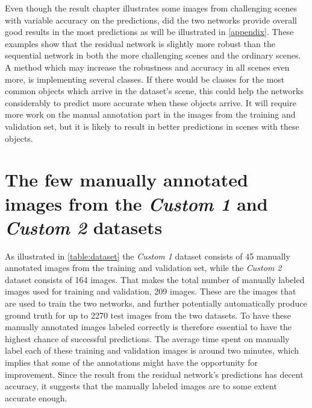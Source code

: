 \documentclass[USenglish]{ifimaster}  %
\begin{document}
Even though the result chapter illustrates some images from challenging scenes with variable accuracy on the predictions, did the two networks provide overall good results in the most predictions as will be illustrated in \vref{appendix}. These examples show that the residual network is slightly more robust than the sequential network in both the more challenging scenes and the ordinary scenes. A method which may increase the robustness and accuracy in all scenes even more, is implementing several classes. If there would be classes for the most common objects which arrive in the dataset's scene, this could help the networks considerably to predict more accurate when these objects arrive. It will require more work on the manual annotation part in the images from the training and validation set, but it is likely to result in better predictions in scenes with these objects. 

\section{The few manually annotated images from the \textit{Custom 1} and \textit{Custom 2} datasets}
As illustrated in \vref{table:dataset} the \textit{Custom 1} dataset consists of 45 manually annotated images from the training and validation set, while the \textit{Custom 2} dataset consists of 164 images. That makes the total number of manually labeled images used for training and validation, 209 images. These are the images that are used to train the two networks, and further potentially automatically produce ground truth for up to 2270 test images from the two datasets. To have these manually annotated images labeled correctly is therefore essential to have the highest chance of successful predictions. The average time spent on manually label each of these training and validation images is around two minutes, which implies that some of the annotations might have the opportunity for improvement. Since the result from the residual network's predictions has decent accuracy, it suggests that the manually labeled images are to some extent accurate enough.          
\end{document}
